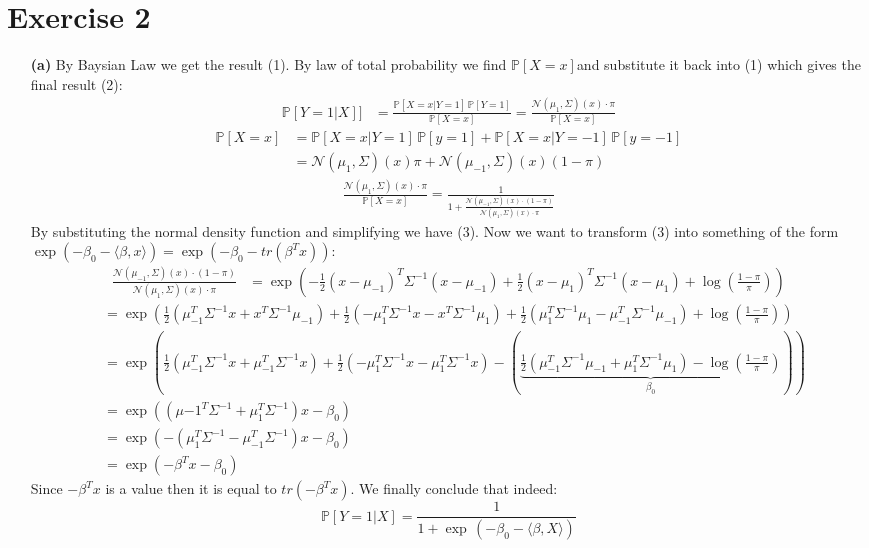 \documentclass[10pt,a4paper]{article}
\begin{document}
\section*{Exercise 2}
\begin{enumerate}
\item[\textbf{(a)}]
By Baysian Law we get the result (1). By law of total probability we find  $\mathbb{P}[X=x]$and substitute it back into (1) which gives the final result (2): 
\begin{align}
\mathbb{P}[Y = 1| X]] &= \frac{\mathbb{P}[X=x | Y =1] \, \mathbb{P}[Y =1]}{\mathbb{P}[X = x]} = \frac{\mathcal{N}(\mu_1, \Sigma)(x) \cdot \pi}{\mathbb{P}[X = x]}
\end{align}
\begin{align*}
\mathbb{P}[X = x] &=  \mathbb{P}[X = x | Y = 1] \, \mathbb{P}[y = 1] +  \mathbb{P}[X = x | Y = -1] \, \mathbb{P}[y = -1] \\
&= \mathcal{N}(\mu_1, \Sigma)(x)\pi + \mathcal{N}(\mu_{-1}, \Sigma)(x)(1-\pi)
\end{align*}
\begin{align}
\frac{\mathcal{N}(\mu_1, \Sigma)(x) \cdot \pi}{\mathbb{P}[X = x]}  = \frac{1}{1+ \frac{\mathcal{N}(\mu_{-1}, \Sigma)(x) \cdot (1- \pi)}{\mathcal{N}(\mu_1, \Sigma)(x) \cdot \pi}}
\end{align}
By substituting the normal density function and simplifying we have (3). Now we want to transform (3) into something of the form $\exp (- \beta_0 - \langle \beta, x\rangle) = \exp ( - \beta_0 - tr( \beta^T x ))$:
\begin{align}
\frac{\mathcal{N}(\mu_{-1}, \Sigma)(x) \cdot (1- \pi)}{\mathcal{N}(\mu_1, \Sigma)(x) \cdot \pi} &=\exp (-\frac{1}{2}(x-\mu_{-1})^T \Sigma ^{-1} (x- \mu_{-1}) +\frac{1}{2}(x-\mu_{1})^T \Sigma ^{-1} (x- \mu_{1}) + \log(\frac{1-\pi}{\pi}))
\end{align}
\begin{align*}
&=  \exp(\frac{1}{2}(\mu_{-1}^T\Sigma^{-1}x + x^T \Sigma ^{-1} \mu_{-1}) + \frac{1}{2}(-\mu_{1}^T\Sigma^{-1}x - x^T \Sigma ^{-1} \mu_{1}) + 
\frac{1}{2}(\mu_1^T\Sigma^{-1}\mu_{1} -\mu_{-1}^T\Sigma^{-1}\mu_{-1} ) + \log (\frac{1-\pi}{\pi}))\\
&= \exp(\frac{1}{2}(\mu_{-1}^T\Sigma^{-1}x + \mu_{-1}^T \Sigma ^{-1} x) + \frac{1}{2}(-\mu_{1}^T\Sigma^{-1}x - \mu_{1}^T \Sigma ^{-1} x) - ( \underbrace{
\frac{1}{2}(\mu_{-1}^T\Sigma^{-1}\mu_{-1} +\mu_{1}^T\Sigma^{-1}\mu_{1} ) - \log (\frac{1-\pi}{\pi})}_{\beta_0})) \\
&= \exp((\mu{-1}^T\Sigma^{-1} + \mu_{1}^T\Sigma^{-1} )x - \beta_0)\\
&=  \exp(-(\mu_{1}^T\Sigma^{-1} - \mu_{-1}^T\Sigma^{-1} )x - \beta_0)\\
&= \exp(- \beta^T x - \beta_0)
\end{align*}
Since $- \beta^T x$ is a value then it is equal to $tr(- \beta^T x)$. We finally conclude that indeed: $$\mathbb{P}[Y = 1 | X] =\frac{1}{1+ \exp \,(-\beta_0 - \langle \beta, X \rangle )} $$


\end{enumerate}
\end{document}
